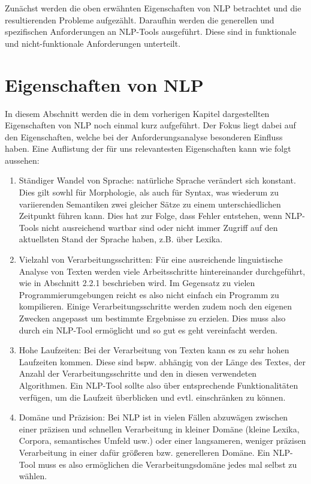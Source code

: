 \documentclass[12pt]{report}
\begin{document}
Zunächst werden die oben erwähnten Eigenschaften von NLP betrachtet und die resultierenden Probleme aufgezählt. Daraufhin werden die generellen und spezifischen Anforderungen an NLP-Tools ausgeführt. Diese sind in funktionale und nicht-funktionale Anforderungen unterteilt.

\section{Eigenschaften von NLP}
In diesem Abschnitt werden die in dem vorherigen Kapitel dargestellten Eigenschaften von NLP noch einmal kurz aufgeführt. Der Fokus liegt dabei auf den Eigenschaften, welche bei der Anforderungsanalyse besonderen Einfluss haben. Eine Auflistung der für uns relevantesten Eigenschaften kann wie folgt aussehen:

\begin{enumerate}
\item Ständiger Wandel von Sprache: natürliche Sprache verändert sich konstant. Dies gilt sowhl für Morphologie, als auch für Syntax, was wiederum zu variierenden Semantiken zwei gleicher Sätze zu einem unterschiedlichen Zeitpunkt führen kann. Dies hat zur Folge, dass Fehler entstehen, wenn NLP-Tools nicht ausreichend wartbar sind oder nicht immer Zugriff auf den aktuellsten Stand der Sprache haben, z.B. über Lexika.
\item Vielzahl von Verarbeitungsschritten: Für eine ausreichende linguistische Analyse von Texten werden viele Arbeitsschritte hintereinander durchgeführt, wie in Abschnitt 2.2.1 beschrieben wird. Im Gegensatz zu vielen Programmierumgebungen reicht es also nicht einfach ein Programm zu kompilieren. Einige Verarbeitungsschritte werden zudem noch den eigenen Zwecken angepasst um bestimmte Ergebnisse zu erzielen. Dies muss also durch ein NLP-Tool ermöglicht und so gut es geht vereinfacht werden.
\item Hohe Laufzeiten: Bei der Verarbeitung von Texten kann es zu sehr hohen Laufzeiten kommen. Diese sind bspw. abhängig von der Länge des Textes, der Anzahl der Verarbeitungsschritte und den in diesen verwendeten Algorithmen. Ein NLP-Tool sollte also über entsprechende Funktionalitäten verfügen, um die Laufzeit überblicken und evtl. einschränken zu können. 
\item Domäne und Präzision: Bei NLP ist in vielen Fällen abzuwägen zwischen einer präzisen und schnellen Verarbeitung in kleiner Domäne (kleine Lexika, Corpora, semantisches Umfeld usw.) oder einer langsameren, weniger präzisen Verarbeitung in einer dafür größeren bzw. generelleren Domäne. Ein NLP-Tool muss es also ermöglichen die Verarbeitungsdomäne jedes mal selbst zu wählen.
\end{enumerate}
\end{document}
